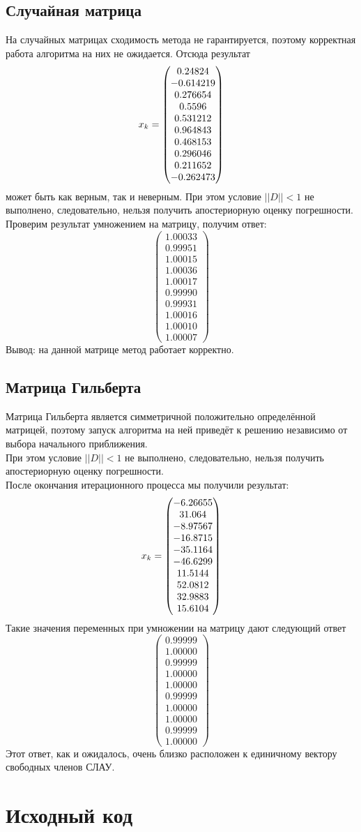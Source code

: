 \documentclass[../../report.tex]{subfiles}
\begin{document}
\subsection{Случайная матрица}
На случайных матрицах сходимость метода не гарантируется, 
поэтому корректная работа алгоритма на них не ожидается. Отсюда результат
\[
x_k = \begin{pmatrix} 0.24824 \\ -0.614219 \\ 0.276654 \\ 0.5596 \\ 0.531212 \\ 0.964843 \\ 0.468153 \\ 0.296046 \\ 0.211652 \\ -0.262473 \end{pmatrix}
\]
может быть как верным, так и неверным. При этом условие $||D|| < 1$ не выполнено, следовательно, нельзя получить апостериорную оценку погрешности. Проверим результат умножением на матрицу, получим ответ:
\[
\begin{pmatrix}
  1.00033 \\
  0.99951 \\
  1.00015 \\
  1.00036 \\
  1.00017 \\
  0.99990 \\
  0.99931 \\
  1.00016 \\
  1.00010 \\
  1.00007
\end{pmatrix}
\]
Вывод: на данной матрице метод работает корректно.

\subsection{Матрица Гильберта}
Матрица Гильберта является симметричной положительно определённой 
матрицей, поэтому запуск алгоритма на ней приведёт к решению 
независимо от выбора начального приближения. \\
При этом условие $||D|| < 1$ не выполнено, следовательно, нельзя получить апостериорную оценку погрешности. \\
После окончания итерационного процесса мы получили результат:
\[
x_k = \begin{pmatrix} -6.26655 \\ 31.064 \\ -8.97567 \\ -16.8715 \\ -35.1164 \\ -46.6299 \\ 11.5144 \\ 52.0812 \\ 32.9883 \\ 15.6104 \end{pmatrix}
\]
Такие значения переменных при умножении на матрицу дают следующий ответ
\[
\begin{pmatrix}
  0.99999 \\
  1.00000 \\
  0.99999 \\
  1.00000 \\
  1.00000 \\
  0.99999 \\
  1.00000 \\
  1.00000 \\
  0.99999 \\
  1.00000
\end{pmatrix}
\]
Этот ответ, как и ожидалось, очень близко расположен к единичному вектору свободных членов СЛАУ.

\section{Исходный код}
\end{document}
